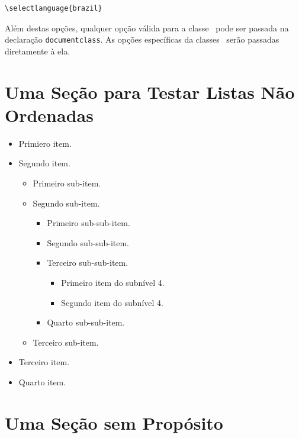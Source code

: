 \documentclass[times,english,brazil,oneside]{ifes7}
\begin{document}
\begin{lstlisting}[language={[LaTeX]TeX}]
  \selectlanguage{brazil}  
\end{lstlisting}

Além destas opções, qualquer opção válida para a classe \abnTeX\ pode
ser passada na declaração \texttt{documentclass}. As opções
específicas da classes \abnTeX\ serão passadas diretamente à ela.


\section{Uma Seção para Testar Listas Não Ordenadas}

\blindtext[1]

\begin{itemize}
\item Primiero item.
\item Segundo item.
  \begin{itemize}
  \item Primeiro sub-item.
  \item Segundo sub-item.
    \begin{itemize}
    \item Primeiro sub-sub-item.
    \item Segundo sub-sub-item.
    \item Terceiro sub-sub-item.
      \begin{itemize}
      \item Primeiro item do subnível 4.
      \item Segundo item do subnível 4.
      \end{itemize}
    \item Quarto sub-sub-item.
    \end{itemize}
  \item Terceiro sub-item.
  \end{itemize}
\item Terceiro item.
\item Quarto item.
\end{itemize}

\blindtext[2]


\section{Uma Seção sem Propósito}
\label{sec:sem-proposito1}

\Blindtext

\blinditemize[7]

\blindtext[2]
\end{document}

